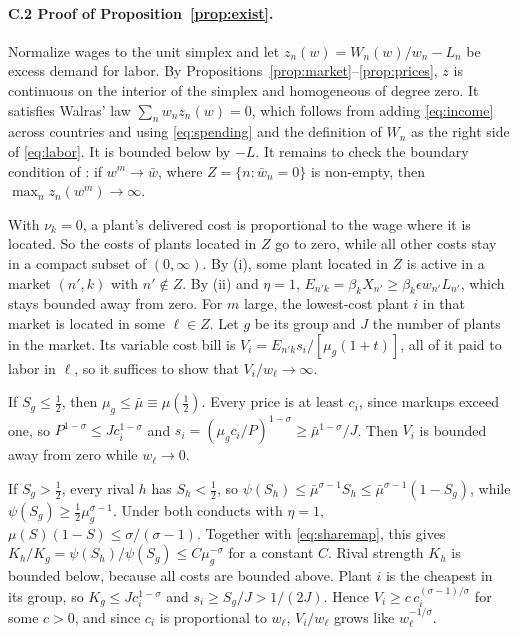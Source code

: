 \documentclass[11pt]{article}
\theoremstyle{definition}
\theoremstyle{remark}
\begin{document}
\paragraph{C.2 Proof of Proposition~\ref{prop:exist}.} Normalize wages to the unit
simplex and let $z_n(w)=W_n(w)/w_n-L_n$ be excess demand for labor. By
Propositions~\ref{prop:market}--\ref{prop:prices}, $z$ is continuous on the interior of
the simplex and homogeneous of degree zero. It satisfies Walras' law
$\sum_nw_nz_n(w)=0$, which follows from adding \eqref{eq:income} across countries and
using \eqref{eq:spending} and the definition of $W_n$ as the right side of
\eqref{eq:labor}. It is bounded below by $-L$. It remains to check the boundary
condition of \citet[Proposition 17.C.1]{MWG1995}: if $w^m\to\bar w$, where
$Z=\{n:\bar w_n=0\}$ is non-empty, then $\max_nz_n(w^m)\to\infty$.

With $\nu_k=0$, a plant's delivered cost is proportional to the wage where it is
located. So the costs of plants located in $Z$ go to zero, while all other costs stay in
a compact subset of $(0,\infty)$. By (i), some plant located in $Z$ is active in a
market $(n',k)$ with $n'\notin Z$. By (ii) and $\eta=1$,
$E_{n'k}=\beta_kX_{n'}\ge\beta_k\epsilon w_{n'}L_{n'}$, which stays bounded away from
zero. For $m$ large, the lowest-cost plant $i$ in that market is located in some
$\ell\in Z$. Let $g$ be its group and $J$ the number of plants in the market. Its
variable cost bill is $V_i=E_{n'k}s_i/[\mu_g(1+t)]$, all of it paid to labor in $\ell$,
so it suffices to show that $V_i/w_\ell\to\infty$.

If $S_g\le\frac12$, then $\mu_g\le\bar\mu\equiv\mu(\frac12)$. Every price is at least
$c_i$, since markups exceed one, so $P^{1-\sigma}\le Jc_i^{1-\sigma}$ and
$s_i=(\mu_gc_i/P)^{1-\sigma}\ge\bar\mu^{1-\sigma}/J$. Then $V_i$ is bounded away from
zero while $w_\ell\to0$.

If $S_g>\frac12$, every rival $h$ has $S_h<\frac12$, so
$\psi(S_h)\le\bar\mu^{\sigma-1}S_h\le\bar\mu^{\sigma-1}(1-S_g)$, while
$\psi(S_g)\ge\frac12\mu_g^{\sigma-1}$. Under both conducts with $\eta=1$,
$\mu(S)(1-S)\le\sigma/(\sigma-1)$. Together with \eqref{eq:sharemap}, this gives
$K_h/K_g=\psi(S_h)/\psi(S_g)\le C\mu_g^{-\sigma}$ for a constant $C$. Rival strength
$K_h$ is bounded below, because all costs are bounded above. Plant $i$ is the cheapest
in its group, so $K_g\le Jc_i^{1-\sigma}$ and $s_i\ge S_g/J>1/(2J)$. Hence $V_i\ge
c\,c_i^{(\sigma-1)/\sigma}$ for some $c>0$, and since $c_i$ is proportional to $w_\ell$,
$V_i/w_\ell$ grows like $w_\ell^{-1/\sigma}$.
\end{document}
